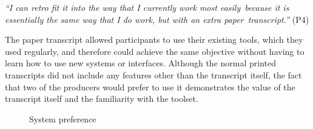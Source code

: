 \textit{``I can retro fit it into the way that I currently work most easily because it is essentially the same way that
I do work, but with an extra paper transcript.''} (P4)


The paper transcript allowed participants to use their existing tools, which they used regularly, and therefore could
achieve the same objective without having to learn how to use new systems or interfaces. Although the normal printed
transcripts did not include any features other than the transcript itself, the fact that two of the producers would
prefer to use it demonstrates the value of the transcript itself and the familiarity with the toolset.

\begin{figure}[p]
    \centering
    \caption{System preference}
    \label{fig:pen-preference}
\end{figure}

